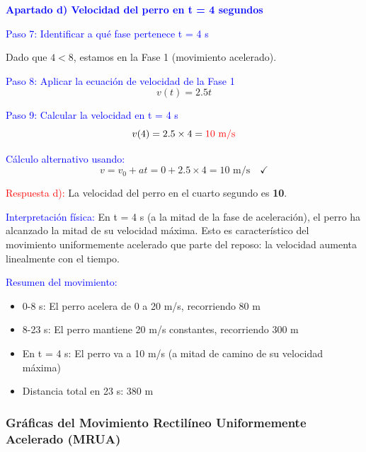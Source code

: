 \begin{exercise}
\begin{solu}
        \vspace{0.5cm}

        \textbf{\textcolor{blue}{Apartado d) Velocidad del perro en t = 4 segundos}}

        \textcolor{blue}{Paso 7: Identificar a qué fase pertenece t = 4 s}

        Dado que $4 < 8$, estamos en la Fase 1 (movimiento acelerado).

        \textcolor{blue}{Paso 8: Aplicar la ecuación de velocidad de la Fase 1}
        \[
            v(t) = 2.5t
        \]

        \textcolor{blue}{Paso 9: Calcular la velocidad en t = 4 s}
        \[
            v(4) = 2.5 \times 4 = \textcolor{red}{10 \text{ m/s}}
        \]

        \textcolor{blue}{Cálculo alternativo usando:}
        \[
            v = v_0 + at = 0 + 2.5 \times 4 = 10 \text{ m/s} \quad \checkmark
        \]

        \textcolor{red}{Respuesta d):} La velocidad del perro en el cuarto segundo es \textbf{\qty{10}{\mps}}.

        \vspace{0.3cm}

        \textcolor{blue}{Interpretación física:} En t = 4 s (a la mitad de la fase de aceleración), el perro ha alcanzado la mitad de su velocidad máxima. Esto es característico del movimiento uniformemente acelerado que parte del reposo: la velocidad aumenta linealmente con el tiempo.

        \vspace{0.3cm}

        \textcolor{blue}{Resumen del movimiento:}
        \begin{itemize}
            \item 0-8 s: El perro acelera de 0 a 20 m/s, recorriendo 80 m
            \item 8-23 s: El perro mantiene 20 m/s constantes, recorriendo 300 m
            \item En t = 4 s: El perro va a 10 m/s (a mitad de camino de su velocidad máxima)
            \item Distancia total en 23 s: 380 m
        \end{itemize}
    \end{solu}
\end{exercise}

\subsubsection{Gráficas del Movimiento Rectilíneo Uniformemente Acelerado (MRUA)}

